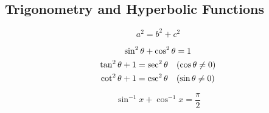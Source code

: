 \newpage
\subsection{Trigonometry and Hyperbolic Functions}%
\label{sub:trigonometry-and-hyperbolic}

\begin{multicols}{2}

    \begin{CheatsheetEntryFrame}


        \begin{equation*}
            a^2 = b^2 + c^2
        \end{equation*}

        \begin{gather*}
            \sin^2{\theta} + \cos^2{\theta} = 1 \\
            \tan^2{\theta} + 1 = \sec^2{\theta}
                \quad \parens*{\cos{\theta} \ne 0} \\
            \cot^2{\theta} + 1 = \csc^2{\theta}
                \quad \parens*{\sin{\theta} \ne 0}
        \end{gather*}

        \begin{equation*}
            \sin^{-1}{x} + \cos^{-1}{x} = \frac{\pi}{2}
        \end{equation*}


\end{CheatsheetEntryFrame}
\end{multicols}

